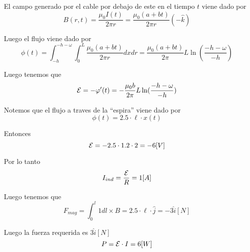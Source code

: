 \documentclass[../main.tex]{subfiles}
\begin{document}
\begin{solution}
  El campo generado por el cable por debajo de este en el tiempo $t$ viene dado por
  \begin{equation*}
    B(r, t) = \frac{\mu_{0}I(t)}{2\pi r} = \frac{\mu_{0} (a + bt)}{2\pi r} (-\hat{k})
  \end{equation*}

  Luego el flujo viene dado por
  \begin{equation*}
    \phi(t) = \int_{-h}^{-h - \omega}\int_{0}^{L} \frac{\mu_{0} (a + bt)}{2\pi r} dx dr = \frac{\mu_{0} (a + bt)}{2\pi} L \ln(\frac{-h - \omega}{-h})
  \end{equation*}

  Luego tenemos que
  \begin{equation*}
    \mathcal{E} = -\varphi'(t) = - \frac{\mu_{0} b}{2\pi} L \ln(\frac{-h - \omega}{-h})
  \end{equation*}
\end{solution}
\begin{solution}
  Notemos que el flujo a traves de la ``espira'' viene dado por
  \begin{equation*}
    \phi(t) = 2.5 \cdot \ell \cdot x(t)
  \end{equation*}

  Entonces
  \begin{equation*}
    \mathcal{E} = -2.5 \cdot 1.2 \cdot 2 = -6 [V]
  \end{equation*}

  Por lo tanto
  \begin{equation*}
    I_{ind} = \frac{\mathcal{E}}{R} = 1 [A]
  \end{equation*}

  Luego tenemos que
  \begin{equation*}
    F_{mag} = \int_{0}^{l} 1 dl \times B = 2.5 \cdot \ell \cdot \hat{j} = -3 \hat{i} [N]
  \end{equation*}

  Luego la fuerza requerida es $3 \hat{i} [N]$
  \begin{equation*}
    P = \mathcal{E} \cdot I = 6 [W]
  \end{equation*}
\end{solution}
\end{document}

